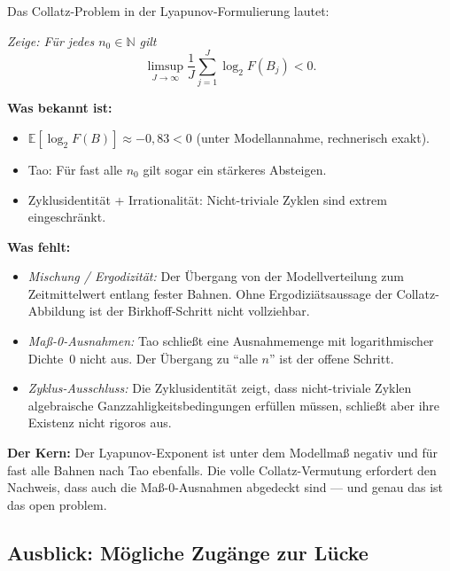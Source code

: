\documentclass[12pt,a4paper]{article}
\newcommand{\N}{\mathbb{N}}
\newcommand{\E}{\mathbb{E}}
\newcommand{\logt}{\log_2}        %
\begin{document}
\begin{tcolorbox}[lücke, title={Die eine verbleibende Lücke}]
Das Collatz-Problem in der Lyapunov-Formulierung lautet:

\medskip
\begin{center}
\textit{Zeige: Für jedes $n_0 \in \N$ gilt
\[
  \limsup_{J\to\infty} \frac{1}{J}\sum_{j=1}^{J}\logt F(B_j) < 0.
\]}
\end{center}

\medskip
\textbf{Was bekannt ist:}
\begin{itemize}[leftmargin=*]
  \item $\E[\logt F(B)] \approx -0{,}83 < 0$ (unter Modellannahme, rechnerisch exakt).
  \item Tao: Für fast alle $n_0$ gilt sogar ein stärkeres Absteigen.
  \item Zyklusidentität + Irrationalität: Nicht-triviale Zyklen sind extrem eingeschränkt.
\end{itemize}

\textbf{Was fehlt:}
\begin{itemize}[leftmargin=*]
  \item \emph{Mischung / Ergodizität:} Der Übergang von der Modellverteilung
    zum Zeitmittelwert entlang fester Bahnen. Ohne Ergodiziätsaussage der
    Collatz-Abbildung ist der Birkhoff-Schritt nicht vollziehbar.
  \item \emph{Maß-0-Ausnahmen:} Tao schließt eine Ausnahmemenge mit
    logarithmischer Dichte~$0$ nicht aus. Der Übergang zu ``alle $n$'' ist der
    offene Schritt.
  \item \emph{Zyklus-Ausschluss:} Die Zyklusidentität zeigt, dass nicht-triviale
    Zyklen algebraische Ganzzahligkeitsbedingungen erfüllen müssen, schließt
    aber ihre Existenz nicht rigoros aus.
\end{itemize}

\medskip
\textbf{Der Kern:} Der Lyapunov-Exponent ist unter dem Modellmaß negativ und
für fast alle Bahnen nach Tao ebenfalls. Die volle Collatz-Vermutung erfordert
den Nachweis, dass auch die Maß-0-Ausnahmen abgedeckt sind --- und genau das
ist das open problem.
\end{tcolorbox}

\subsection{Ausblick: Mögliche Zugänge zur Lücke}
\end{document}
